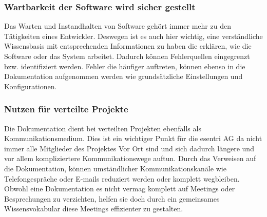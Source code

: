 \documentclass[a4paper,12pt]{scrartcl}
\begin{document}
\subsubsection{Wartbarkeit der Software wird sicher gestellt}
Das Warten und Instandhalten von Software gehört immer mehr zu den Tätigkeiten eines Entwickler. Deswegen ist es auch hier wichtig, eine verständliche Wissensbasis mit entsprechenden Informationen zu haben die erklären, wie die Software oder das System arbeitet. Dadurch können Fehlerquellen eingegrenzt bzw. identifiziert werden. Fehler die häufiger auftreten, können ebenso in die Dokumentation aufgenommen werden wie grundsätzliche Einstellungen und Konfigurationen.
 
\subsubsection{Nutzen für verteilte Projekte}
Die Dokumentation dient bei verteilten Projekten ebenfalls als Kommunikationsmedium. Dies ist ein wichtiger Punkt für die esentri AG da nicht immer alle Mitglieder des Projektes Vor Ort sind und sich dadurch längere und vor allem kompliziertere Kommunikationswege auftun. Durch das Verweisen auf die Dokumentation, können umständlicher Kommunikationskanäle wie Telefongespräche oder E-mails reduziert werden oder komplett wegbleiben. Obwohl eine Dokumentation es nicht vermag komplett auf Meetings oder Besprechungen zu verzichten, helfen sie doch durch ein gemeinsames Wissensvokabular diese Meetings effizienter zu gestalten. 
\end{document}
